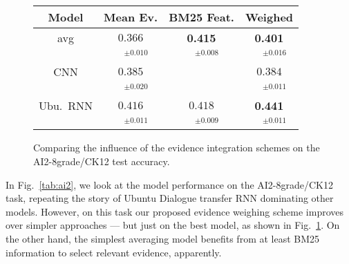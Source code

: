 \documentclass[11pt]{article}
\begin{document}
\begin{figure}[t]
\centering
\setlength{\tabcolsep}{3pt}
\begin{tabular}{|c|c|c|c|}
\hline
Model              & Mean Ev. & BM25 Feat. & Weighed \\
\hline
avg & $0.366$ & \textbf{0.415} & \textbf{0.401}\\
 & $\quad^{\pm0.010}$ & $\quad^{\pm0.008}$ & $\quad^{\pm0.016}$\\
\hline
CNN & $0.385$ &  & $0.384$\\
 & $\quad^{\pm0.020}$ &  & $\quad^{\pm0.011}$\\
Ubu.\ RNN & $0.416$ & $0.418$ & \textbf{0.441}\\
 & $\quad^{\pm0.011}$ & $\quad^{\pm0.009}$ & $\quad^{\pm0.011}$\\
\hline
\end{tabular}
\setlength{\tabcolsep}{6pt}
\vspace*{-0.2cm}
\caption{\footnotesize%
	Comparing the influence of the evidence integration schemes on the AI2-8grade/CK12 test accuracy.
}
\label{tab:ai2ev}
\end{figure}

In Fig.~\ref{tab:ai2}, we look at the model performance on the AI2-8grade/CK12 task,
repeating the story of Ubuntu Dialogue transfer RNN dominating other models.
However, on this task our proposed evidence weighing scheme improves over
simpler approaches --- but just on the best model, as shown in Fig.~\ref{tab:ai2ev}.
On the other hand, the simplest averaging model benefits from at least BM25
information to select relevant evidence, apparently.
\end{document}
